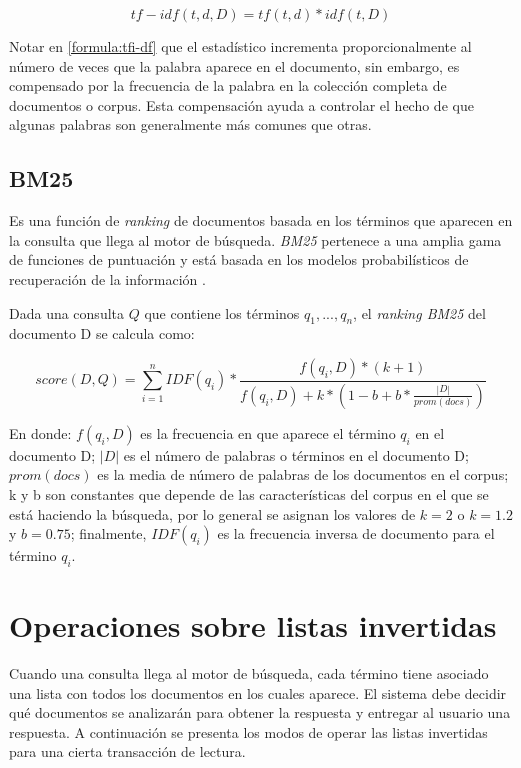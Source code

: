 \begin{equation}
\label{formula:tfi-df}
tf-idf(t,d,D) = tf(t,d) * idf(t,D)
\end{equation}

Notar en \eqref{formula:tfi-df} que el estadístico incrementa proporcionalmente al número de veces que la palabra aparece en el documento, sin embargo, es compensado por la frecuencia de la palabra en la colección completa de documentos o corpus. Esta compensación ayuda a controlar el hecho de que algunas palabras son generalmente más comunes que otras.


\subsection{BM25}
\label{marco:bm25}
Es una función de \textit{ranking} de documentos basada en los términos que aparecen en la consulta que llega al motor de búsqueda. \textit{BM25} pertenece a una amplia gama de funciones de puntuación y está basada en los modelos probabilísticos de recuperación de la información \citep{Baeza-Yates:2011}.

Dada una consulta $Q$ que contiene los términos $q_{1},...,q_{n}$, el \textit{ranking BM25} del documento D se calcula como: 

\begin{equation}
\label{formula:bm25}
score(D,Q) =  \displaystyle\sum_{i=1}^n IDF(q_{i}) * \frac{f(q_{i},D)*(k+1)}{f(q_{i},D)+k * (1 - b + b * \frac{|D|}{prom(docs)})}
\end{equation}

En donde: $f(q_{i}, D)$ es la frecuencia en que aparece el término $q_{i}$ en el documento D; $|D|$ es el número de palabras o términos en el documento D; $prom(docs)$ es la media de número de palabras de los documentos en el corpus; k y b son constantes que depende de las características del corpus en el que se está haciendo la búsqueda, por lo general se asignan los valores de $k = 2$ o $k = 1.2$ y $b = 0.75$; finalmente, $IDF(q_{i})$ es la frecuencia inversa de documento para el término $q_{i}$.


\section{Operaciones sobre listas invertidas}
\label{marco:osli}
Cuando una consulta llega al motor de búsqueda, cada término tiene asociado una lista con todos los documentos en los cuales aparece. El sistema debe decidir qué documentos se analizarán para obtener la respuesta y entregar al usuario una respuesta. A continuación se presenta los modos de operar las listas invertidas para una cierta transacción de lectura.

